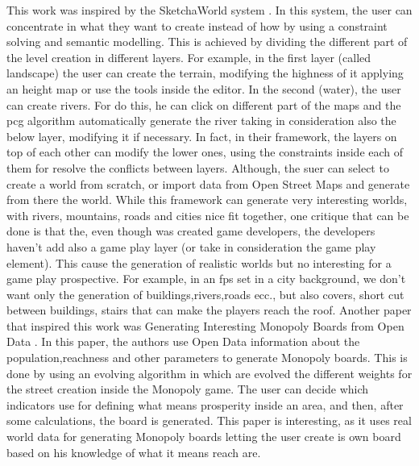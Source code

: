 \documentclass[conference]{IEEEtran}
\begin{document}
This work was inspired by the SketchaWorld system \cite{sketchaworld}. In this system, the user can concentrate in what they want to create instead of how by using a constraint solving and semantic modelling. This is achieved by dividing the different part of the level creation in different layers. For example, in the first layer (called landscape) the user can create the terrain, modifying the highness of it applying an height map or use the tools inside the editor. In the second (water), the user can create rivers. For do this, he can click on different part of the maps and the pcg algorithm automatically generate the river taking in consideration also the below layer, modifying it if necessary. In fact, in their framework, the layers on top of each other can modify the lower ones, using the constraints inside each of them for resolve the conflicts between layers. Although, the suer can select to create a world from scratch, or import data from Open Street Maps and generate from there the world. \newline
While this framework can generate very interesting worlds, with rivers, mountains, roads and cities nice fit together, one critique that can be done is that the, even though was created game developers, the developers haven't add also a game play layer (or take in consideration the game play element). This cause the generation of realistic worlds but no interesting for a game play prospective. For example, in an fps set in a city background, we don't want only the generation of buildings,rivers,roads ecc., but also covers, short cut between buildings, stairs that can make the players reach the roof. 
\newline
\newline
Another paper that inspired this work was Generating Interesting Monopoly Boards from Open Data \cite{monopoly}. In this paper, the authors use Open Data information about the population,reachness and other parameters to generate Monopoly boards. This is done by using an evolving algorithm in which are evolved the different weights for the street creation inside the Monopoly game. The user can decide which indicators use for defining what means prosperity inside an area, and then, after some calculations, the board is generated. This paper is interesting, as it uses real world data for generating Monopoly boards letting the user create is own board based on his knowledge of what it means reach are.
\newline
\newline
\end{document}
